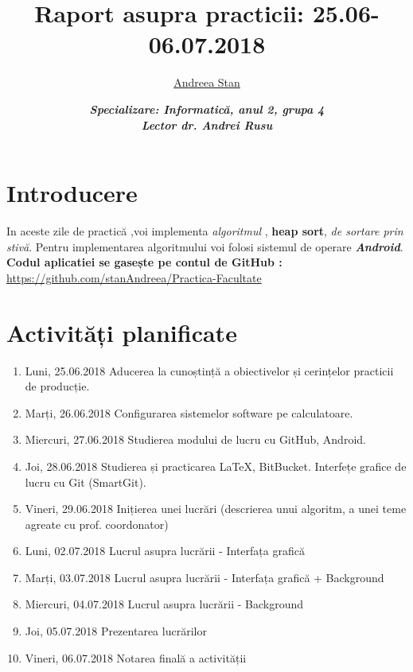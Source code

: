 \documentclass{report}
\title{{\sc Raport asupra practicii: 25.06-06.07.2018}}
\author{\underline{Andreea Stan}}
\date{\textbf{\textit{Specializare: Informatică, anul 2, grupa 4\\  Lector dr. Andrei Rusu}}}
\begin{document}
\maketitle

\tableofcontents

\chapter{Introducere}

In aceste zile de practică ,voi implementa \textit{algoritmul} , \textbf{heap sort}, \textit{de sortare prin stivă}. 
\vskip 0.5cm
Pentru implementarea algoritmului voi folosi sistemul de operare \textbf{\textit{Android}}.
\vskip 0.5cm
\textbf{Codul aplicatiei se gasește pe contul de GitHub :} \\
\url{https://github.com/stanAndreea/Practica-Facultate}

\chapter{Activități planificate}
\begin{enumerate}

\item  Luni, 25.06.2018 \newline
Aducerea la cunoștință a obiectivelor și cerințelor practicii de producție.
\item  Marți, 26.06.2018 \newline
Configurarea sistemelor software pe calculatoare. 
\item  Miercuri, 27.06.2018 \newline
Studierea modului de lucru cu GitHub, Android.
\item  Joi, 28.06.2018 \newline
Studierea și practicarea LaTeX, BitBucket. Interfețe grafice de lucru cu Git (SmartGit).
\item  Vineri, 29.06.2018  \newline
Inițierea unei lucrări (descrierea unui algoritm, a unei teme agreate cu prof. coordonator)
\item  Luni, 02.07.2018  \newline
Lucrul asupra lucrării - Interfața grafică
\item  Marți, 03.07.2018  \newline
Lucrul asupra lucrării - Interfața grafică + Background
\item  Miercuri, 04.07.2018  \newline
Lucrul asupra lucrării - Background
\item  Joi, 05.07.2018  \newline
Prezentarea lucrărilor
\item  Vineri, 06.07.2018  \newline
Notarea finală a activității
\end{enumerate}
\end{document}
